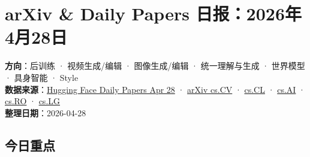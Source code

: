 
\section{arXiv \& Daily Papers 日报：2026年4月28日}

\begin{conceptbox}
\textbf{方向}：后训练 · 视频生成/编辑 · 图像生成/编辑 · 统一理解与生成 · 世界模型 · 具身智能 · Style\\
\textbf{数据来源}：\href{https://huggingface.co/papers}{Hugging Face Daily Papers Apr 28} · \href{https://arxiv.org/list/cs.CV/new}{arXiv cs.CV} · \href{https://arxiv.org/list/cs.CL/new}{cs.CL} · \href{https://arxiv.org/list/cs.AI/new}{cs.AI} · \href{https://arxiv.org/list/cs.RO/new}{cs.RO} · \href{https://arxiv.org/list/cs.LG/new}{cs.LG}\\
\textbf{整理日期}：2026-04-28
\end{conceptbox}

\subsection{今日重点}

